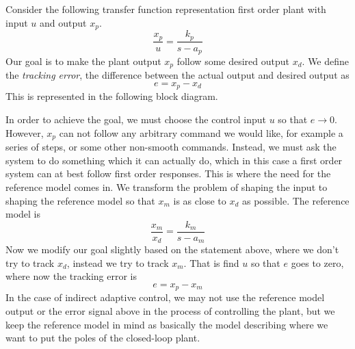 Consider the following transfer function representation first order plant with input $u$ and output $x_{p}$.
\begin{equation*}
  \frac{x_{p}}{u}=\frac{k_{p}}{s-a_{p}}
\end{equation*}
Our goal is to make the plant output $x_{p}$ follow some desired output $x_{d}$.
We define the \textit{tracking error}, the difference between the actual output and desired output as
\begin{equation*}
  e=x_{p}-x_{d}
\end{equation*}
This is represented in the following block diagram.
\begin{figure}[H]
  \begin{center}
  \end{center}
\end{figure}


In order to achieve the goal, we must choose the control input $u$ so that $e\rightarrow0$.
However, $x_{p}$ can not follow any arbitrary command we would like, for example a series of steps, or some other non-smooth commands.
Instead, we must ask the system to do something which it can actually do, which in this case a first order system can at best follow first order responses.
This is where the need for the reference model comes in.
We transform the problem of shaping the input to shaping the reference model so that $x_{m}$ is as close to $x_{d}$ as possible.
The reference model is
\begin{equation*}
  \frac{x_{m}}{x_{d}}=\frac{k_{m}}{s-a_{m}}
\end{equation*}
Now we modify our goal slightly based on the statement above, where we don't try to track $x_{d}$, instead we try to track $x_{m}$.
That is find $u$ so that $e$ goes to zero, where now the tracking error is
\begin{equation*}
  e=x_{p}-x_{m}
\end{equation*}
In the case of indirect adaptive control, we may not use the reference model output or the error signal above in the process of controlling the plant, but we keep the reference model in mind as basically the model describing where we want to put the poles of the closed-loop plant.

